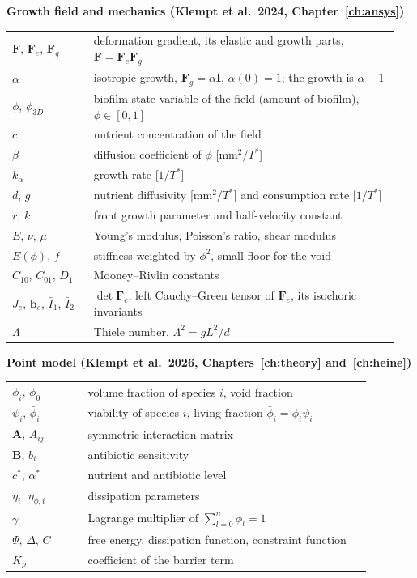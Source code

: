 \documentclass[12pt, a4paper, twoside]{report}
\begin{document}
\medskip\noindent\textbf{Growth field and mechanics (Klempt et al.\ 2024, Chapter~\ref{ch:ansys})}\\[2pt]
\begin{tabular}{@{}p{0.2\linewidth}p{0.75\linewidth}@{}}
$\mathbf F$, $\mathbf F_e$, $\mathbf F_g$ & deformation gradient, its elastic and growth parts, $\mathbf F=\mathbf F_e\mathbf F_g$\\
$\alpha$ & isotropic growth, $\mathbf F_g=\alpha\mathbf I$, $\alpha(0)=1$; the growth is $\alpha-1$\\
$\phi$, $\phi_{3D}$ & biofilm state variable of the field (amount of biofilm), $\phi\in[0,1]$\\
$c$ & nutrient concentration of the field\\
$\beta$ & diffusion coefficient of $\phi$ [mm$^2/T^*$]\\
$k_\alpha$ & growth rate [$1/T^*$]\\
$d$, $g$ & nutrient diffusivity [mm$^2/T^*$] and consumption rate [$1/T^*$]\\
$r$, $k$ & front growth parameter and half-velocity constant\\
$E$, $\nu$, $\mu$ & Young's modulus, Poisson's ratio, shear modulus\\
$E(\phi)$, $f$ & stiffness weighted by $\phi^2$, small floor for the void\\
$C_{10}$, $C_{01}$, $D_1$ & Mooney--Rivlin constants\\
$J_e$, $\mathbf b_e$, $\bar I_1$, $\bar I_2$ & $\det\mathbf F_e$, left Cauchy--Green tensor of $\mathbf F_e$, its isochoric invariants\\
$\Lambda$ & Thiele number, $\Lambda^2=gL^2/d$\\
\end{tabular}

\medskip\noindent\textbf{Point model (Klempt et al.\ 2026, Chapters~\ref{ch:theory} and~\ref{ch:heine})}\\[2pt]
\begin{tabular}{@{}p{0.2\linewidth}p{0.75\linewidth}@{}}
$\phi_i$, $\phi_0$ & volume fraction of species $i$, void fraction\\
$\psi_i$, $\bar\phi_i$ & viability of species $i$, living fraction $\bar\phi_i=\phi_i\psi_i$\\
$\mathbf A$, $A_{ij}$ & symmetric interaction matrix\\
$\mathbf B$, $b_i$ & antibiotic sensitivity\\
$c^*$, $\alpha^*$ & nutrient and antibiotic level\\
$\eta_i$, $\eta_{\phi,i}$ & dissipation parameters\\
$\gamma$ & Lagrange multiplier of $\sum_{l=0}^{n}\phi_l=1$\\
$\Psi$, $\Delta$, $C$ & free energy, dissipation function, constraint function\\
$K_p$ & coefficient of the barrier term\\
\end{tabular}
\end{document}
